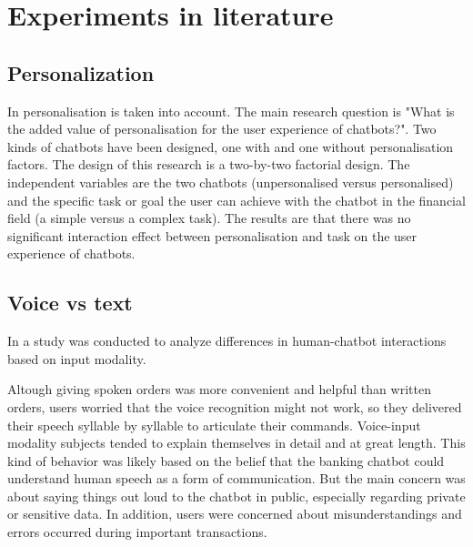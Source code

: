\section{Experiments in literature}

\subsection{Personalization} 
In \cite{duijst2017} personalisation is taken into account. The main research question is "What is the added value of personalisation for the user experience of chatbots?". Two kinds of chatbots have been designed, one with and one without personalisation factors. The design of this research is a two-by-two factorial design. The independent variables are the two chatbots (unpersonalised versus personalised) and the specific task or goal the user can achieve with the chatbot in the financial field (a simple versus a complex task). The results are that there was no significant interaction effect between personalisation and task on the user experience of chatbots. 


\subsection{Voice vs text}
In \cite{kim2018} a study was conducted to analyze differences in human-chatbot interactions based on input modality.

Altough giving spoken orders was more convenient and helpful than written orders, users worried that the voice recognition might not work, so they delivered their speech syllable by syllable to articulate their commands. Voice-input modality subjects tended to explain themselves in detail and at great length. This kind of behavior was likely based on the belief that the banking chatbot could understand human speech as a form of communication. But the main concern was about saying things out loud to the chatbot in public, especially regarding private or sensitive data. In addition, users were concerned about misunderstandings and errors occurred during important transactions.


